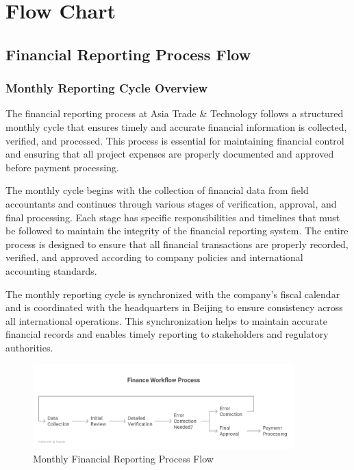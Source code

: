 
\chapter{Flow Chart}

\section{Financial Reporting Process Flow}

\subsection{Monthly Reporting Cycle Overview}
The financial reporting process at Asia Trade \& Technology follows a structured monthly cycle that ensures timely and accurate financial information is collected, verified, and processed. This process is essential for maintaining financial control and ensuring that all project expenses are properly documented and approved before payment processing.

The monthly cycle begins with the collection of financial data from field accountants and continues through various stages of verification, approval, and final processing. Each stage has specific responsibilities and timelines that must be followed to maintain the integrity of the financial reporting system. The entire process is designed to ensure that all financial transactions are properly recorded, verified, and approved according to company policies and international accounting standards.

The monthly reporting cycle is synchronized with the company's fiscal calendar and is coordinated with the headquarters in Beijing to ensure consistency across all international operations. This synchronization helps to maintain accurate financial records and enables timely reporting to stakeholders and regulatory authorities.

\begin{figure}[H]
    \centering
    \includegraphics[width=0.9\textwidth]{assets/images/financial_flowchart.png}
    \caption{Monthly Financial Reporting Process Flow}
    \label{fig:financial_flowchart}
\end{figure}

